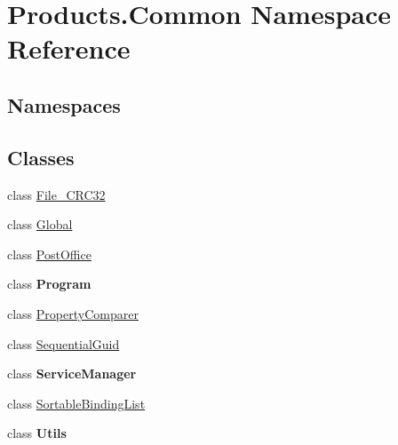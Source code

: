 \hypertarget{namespace_products_1_1_common}{}\section{Products.\+Common Namespace Reference}
\label{namespace_products_1_1_common}
\subsection*{Namespaces}
\begin{DoxyCompactItemize}
\end{DoxyCompactItemize}
\subsection*{Classes}
\begin{DoxyCompactItemize}
\item 
class \hyperlink{class_products_1_1_common_1_1_file___c_r_c32}{File\+\_\+\+C\+R\+C32}
\item 
class \hyperlink{class_products_1_1_common_1_1_global}{Global}
\item 
class \hyperlink{class_products_1_1_common_1_1_post_office}{Post\+Office}
\item 
class {\bfseries Program}
\item 
class \hyperlink{class_products_1_1_common_1_1_property_comparer}{Property\+Comparer}
\item 
class \hyperlink{class_products_1_1_common_1_1_sequential_guid}{Sequential\+Guid}
\item 
class {\bfseries Service\+Manager}
\item 
class \hyperlink{class_products_1_1_common_1_1_sortable_binding_list}{Sortable\+Binding\+List}
\item 
class {\bfseries Utils}
\end{DoxyCompactItemize}
